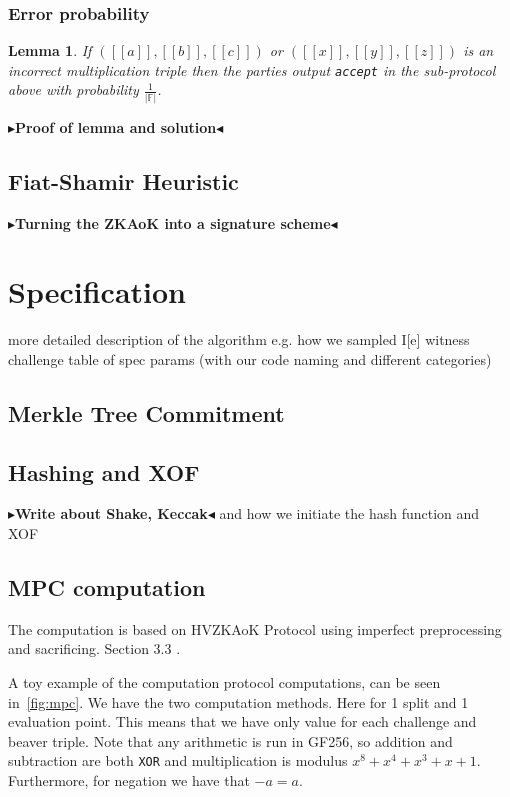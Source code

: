 \documentclass[twoside,11pt,openright]{report}
\theoremstyle{definition}
\theoremstyle{plain}
\newtheorem{lemma}{Lemma}[section]
\newcommand{\todo}[1]{{\color[rgb]{.5,0,0}\textbf{$\blacktriangleright$#1$\blacktriangleleft$}}}
\begin{document}
\subsection{Error probability}

\begin{lemma}
  If $([[a]], [[b]], [[c]])$ or $([[x]], [[y]], [[z]])$ is an incorrect multiplication triple then the parties output \texttt{accept} in the sub-protocol above with probability $\frac{1}{|\mathbb{F}|}$.
\end{lemma}

\todo{Proof of lemma and solution}

\section{Fiat-Shamir Heuristic}
\label{sec:fiatshamir}

\todo{Turning the ZKAoK into a signature scheme}


\chapter{Specification}
\label{ch:spec}
more detailed description of the algorithm
e.g. how we sampled I[e] witness challenge
table of spec params (with our code naming and different categories)

\section{Merkle Tree Commitment}

\section{Hashing and XOF}

\todo{Write about Shake, Keccak} and how we initiate the hash function and XOF

\section{MPC computation}

The computation is based on HVZKAoK Protocol using imperfect preprocessing and sacrificing. Section 3.3 \cite{baum2020concretely}.

A toy example of the computation protocol computations, can be seen in~\autoref{fig:mpc}. We have the two computation methods. Here for 1 split and 1 evaluation point. This means that we have only value for each challenge and beaver triple. Note that any arithmetic is run in GF256, so addition and subtraction are both \texttt{XOR} and multiplication is modulus $x^8 + x^4 + x^3 + x + 1$. Furthermore, for negation we have that $-a = a$.
\end{document}
